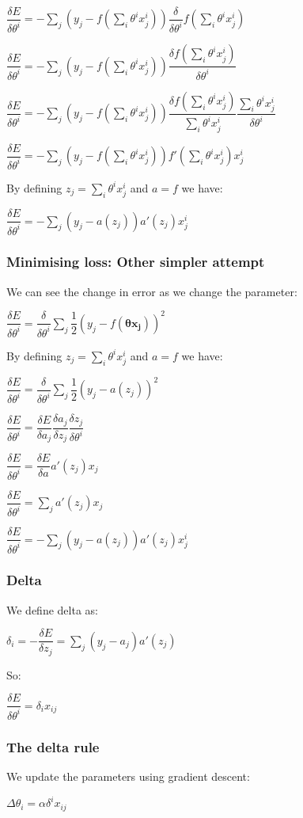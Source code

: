 \(\dfrac{\delta E}{\delta \theta^i }=-\sum_j(y_j-f(\sum_i\theta^i x_j^i))\dfrac{\delta }{\delta \theta^i}f(\sum_i\theta^i x_j^i)\)

\(\dfrac{\delta E}{\delta \theta^i }=-\sum_j(y_j-f(\sum_i\theta^i x_j^i))\dfrac{\delta f(\sum_i\theta^ix_j^i)}{\delta \theta^i}\)

\(\dfrac{\delta E}{\delta \theta^i }=-\sum_j(y_j-f(\sum_i\theta^i x_j^i))\dfrac{\delta f(\sum_i\theta^ix_j^i)}{\sum_i\theta^ix_j^i}\dfrac{\sum_i\theta^ix_j^i}{\delta \theta^i}\)

\(\dfrac{\delta E}{\delta \theta^i }=-\sum_j(y_j-f(\sum_i\theta^i x_j^i))f'(\sum_i\theta^ix_j^i)x_j^i\)

By defining \(z_j=\sum_i\theta^ix_j^i\) and \(a=f\) we have:

\(\dfrac{\delta E}{\delta \theta^i }=-\sum_j(y_j-a(z_j))a'(z_j)x_j^i\)

\subsubsection{Minimising loss: Other simpler attempt}

We can see the change in error as we change the parameter:

\(\dfrac{\delta E}{\delta \theta^i }=\dfrac{\delta }{\delta \theta^i}\sum_j\dfrac{1}{2}(y_j-f(\boldsymbol{\theta x_j}))^2\)

By defining \(z_j=\sum_i\theta^ix_j^i\) and \(a=f\) we have:

\(\dfrac{\delta E}{\delta \theta^i }=\dfrac{\delta }{\delta \theta^i}\sum_j\dfrac{1}{2}(y_j-a(z_j))^2\)

\(\dfrac{\delta E}{\delta \theta^i }=\dfrac{\delta E}{\delta a_j}\dfrac{\delta a_j}{\delta z_j}\dfrac{\delta z_j}{\delta \theta^i}\)

\(\dfrac{\delta E}{\delta \theta^i }=\dfrac{\delta E}{\delta a}a'(z_j)x_j\)

\(\dfrac{\delta E}{\delta \theta^i }=\sum_ja'(z_j)x_j\)

\(\dfrac{\delta E}{\delta \theta^i }=-\sum_j(y_j-a(z_j))a'(z_j)x_j^i\)

\subsubsection{Delta}

We define delta as:

\(\delta_i=-\dfrac{\delta E}{\delta z_j}=\sum_j(y_j-a_j)a'(z_j)\)

So:

\(\dfrac{\delta E}{\delta \theta^i }=\delta_i x_{ij}\)

\subsubsection{The delta rule}

We update the parameters using gradient descent:

\(\Delta \theta_i=\alpha \delta^i x_{ij}\)

